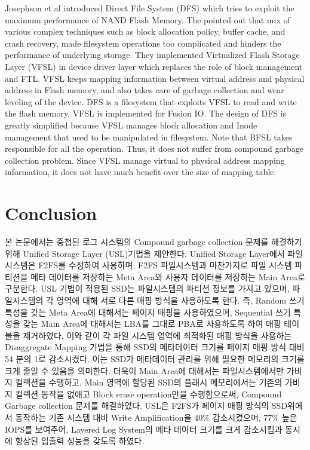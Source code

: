 \documentclass[letterpaper,twocolumn,10pt]{article}
\begin{document}
Josephson et al\cite{josephson2010dfs} introduced Direct File System (DFS) which tries to exploit the maximum performance of NAND Flash Memory. The pointed out that mix of various complex techniques such as block allocation policy, buffer cache, and crash recovery, made filesystem operations too complicated and hinders the performance of underlying storage. They implemented Virtualized Flash Storage Layer (VFSL) in device driver layer which replaces the role of block management and FTL. VFSL keeps mapping information between virtual address and physical address in Flash memory, and also takes care of garbage collection and wear leveling of the device. DFS is a filesystem that exploits VFSL to read and write the flash memory. VFSL is implemented for Fusion IO. The design of DFS is greatly simplified because VFSL manages block allocation and Inode management that used to be manipulated in filesystem. Note that BFSL takes responsible for all the operation. Thus, it does not suffer from compound garbage collection problem. Since VFSL manage virtual to physical address mapping information, it does not have much benefit over the size of mapping table.


\section{Conclusion}

본 논문에서는 중첩된 로그 시스템의 Compound garbage collection 문제를 해결하기 위해 Unified Storage Layer (USL)기법을 제안한다. Unified Storage Layer에서 파일 시스템은 F2FS를 수정하여 사용하며, F2FS 파일시스템과 마찬가지로 파일 시스템 파티션을 메타 데이터를 저장하는 Meta Area와 사용자 데이터를 저장하는 Main Area로 구분한다. USL 기법이 적용된 SSD는 파일시스템의 파티션 정보를 가지고 있으며, 파일시스템의 각 영역에 대해 서로 다른 매핑 방식을 사용하도록 한다. 즉, Random 쓰기 특성을 갖는 Meta Area에 대해서는 페이지 매핑을 사용하였으며, Sequential 쓰기 특성을 갖는 Main Area에 대해서는 LBA를 그대로 PBA로 사용하도록 하여 매핑 테이블을 제거하였다. 이와 같이 각 파일 시스템 영역에 최적화된 매핑 방식을 사용하는 Disaggregate Mapping 기법을 통해 SSD의 메타데이터 크기를 페이지 매핑 방식 대비 54 분의 1로 감소시켰다. 이는 SSD가 메타데이터 관리를 위해 필요한 메모리의 크기를 크게 줄일 수 있음을 의미한다. 더욱이 Main Area에 대해서는 파일시스템에서만 가비지 컬렉션을 수행하고, Main 영역에 할당된 SSD의 플래시 메모리에서는 기존의 가비지 컬렉션 동작을 없애고 Block erase operation만을 수행함으로써, Compound Garbage collection 문제를 해결하였다. USL은 F2FS가 페이지 매핑 방식의 SSD위에서 동작하는 기존 시스템 대비 Write Amplification을 40\% 감소시켰으며, 77\% 높은 IOPS를 보여주어, Layered Log System의 메타 데이터 크기를 크게 감소시킴과 동시에 향상된 입출력 성능을 갖도록 하였다.



\end{document}
